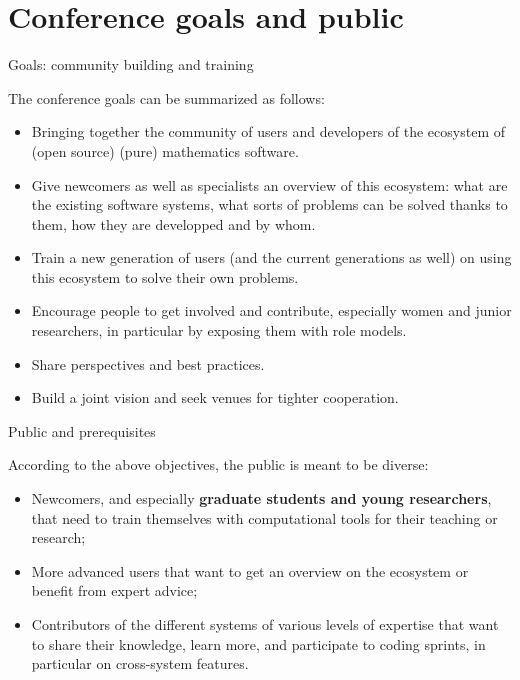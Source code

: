 \documentclass[12pt]{amsart}
\makeatletter
\def\subsection{\@startsection{subsection}{2}%
  \z@{.3\linespacing\@plus.5\linespacing}{.1\linespacing}%
  {\normalfont\bfseries}}
\makeatother
\begin{document}
\section{Conference goals and public}

\subsection{Goals: community building and training}

The conference goals can be summarized as follows:

\begin{itemize}
\item Bringing together the community of users and developers of the
  ecosystem of (open source) (pure) mathematics software.
\item Give newcomers as well as specialists an overview of this
  ecosystem: what are the existing software systems, what sorts of
  problems can be solved thanks to them, how they are developped and
  by whom.
\item Train a new generation of users (and the current generations as
  well) on using this ecosystem to solve their own problems.
\item Encourage people to get involved and contribute, especially
  women and junior researchers, in particular by exposing them with role models.
\item Share perspectives and best practices. 
\item Build a joint vision and
  seek venues for tighter cooperation.
\end{itemize}

\subsection{Public and prerequisites}

According to the above objectives, the public is meant to be diverse:
\begin{itemize}
\item Newcomers, and especially \textbf{graduate students and young
    researchers}, that need to train themselves with computational
  tools for their teaching or research;
\item More advanced users that want to get an overview on the
  ecosystem or benefit from expert advice;
\item Contributors of the different systems of various levels of
  expertise that want to share their knowledge, learn more, and
  participate to coding sprints, in particular on cross-system
  features.
\end{itemize}
\end{document}
